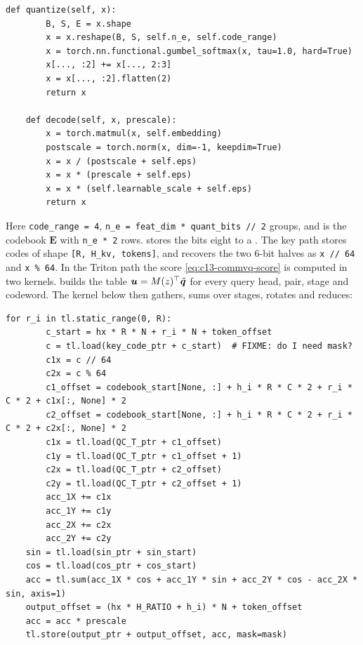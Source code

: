 \begin{lstlisting}[caption={Excerpt from \texttt{repos/UMass-Embodied-AGI\_\_CommVQ/commvq/compress\_evaluation.py} (\texttt{ValueCompressor})},label={lst:c13-commvq-value}]
    def quantize(self, x):
        B, S, E = x.shape
        x = x.reshape(B, S, self.n_e, self.code_range)
        x = torch.nn.functional.gumbel_softmax(x, tau=1.0, hard=True)
        x[..., :2] += x[..., 2:3]
        x = x[..., :2].flatten(2)
        return x

    def decode(self, x, prescale):
        x = torch.matmul(x, self.embedding)
        postscale = torch.norm(x, dim=-1, keepdim=True)
        x = x / (postscale + self.eps)
        x = x * (prescale + self.eps)
        x = x * (self.learnable_scale + self.eps)
        return x
\end{lstlisting}

Here \texttt{code\_range = 4}, \texttt{n\_e = feat\_dim * quant\_bits // 2} groups, and  is the
codebook $\mathbf{E}$ with \texttt{n\_e * 2} rows.  stores the bits eight to a .
The key path stores  codes of shape \texttt{[R, H\_kv, tokens]}, and  recovers the
two 6-bit halves as \texttt{x // 64} and \texttt{x \% 64}. In the Triton path the score
\eqref{eq:c13-commvq-score} is computed in two kernels.  builds the table
$\bm{u}=M(z)^{\top}\tilde{\bm{q}}$ for every query head, pair, stage and codeword. The kernel below then gathers,
sums over stages, rotates and reduces:

\begin{lstlisting}[caption={Excerpt from \texttt{repos/UMass-Embodied-AGI\_\_CommVQ/commvq/triton\_kernels.py}},label={lst:c13-commvq-kernel}]
    for r_i in tl.static_range(0, R):
        c_start = hx * R * N + r_i * N + token_offset
        c = tl.load(key_code_ptr + c_start)  # FIXME: do I need mask?
        c1x = c // 64
        c2x = c % 64
        c1_offset = codebook_start[None, :] + h_i * R * C * 2 + r_i * C * 2 + c1x[:, None] * 2
        c2_offset = codebook_start[None, :] + h_i * R * C * 2 + r_i * C * 2 + c2x[:, None] * 2
        c1x = tl.load(QC_T_ptr + c1_offset)
        c1y = tl.load(QC_T_ptr + c1_offset + 1)
        c2x = tl.load(QC_T_ptr + c2_offset)
        c2y = tl.load(QC_T_ptr + c2_offset + 1)
        acc_1X += c1x
        acc_1Y += c1y
        acc_2X += c2x
        acc_2Y += c2y
    sin = tl.load(sin_ptr + sin_start)
    cos = tl.load(cos_ptr + cos_start)
    acc = tl.sum(acc_1X * cos + acc_1Y * sin + acc_2Y * cos - acc_2X * sin, axis=1)
    output_offset = (hx * H_RATIO + h_i) * N + token_offset
    acc = acc * prescale
    tl.store(output_ptr + output_offset, acc, mask=mask)
\end{lstlisting}

